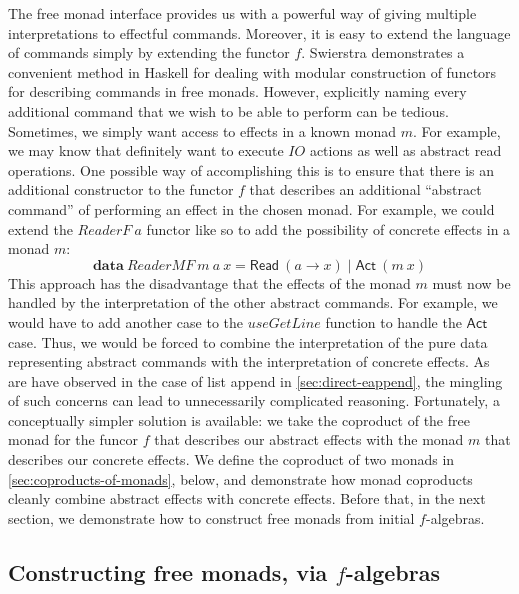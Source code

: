 \documentclass{jfp1}
\newcommand{\kw}[1]{\textbf{#1}}
\begin{document}
The free monad interface provides us with a powerful way of giving
multiple interpretations to effectful commands. Moreover, it is easy
to extend the language of commands simply by extending the functor
$f$. Swierstra \cite{swierstra08data} demonstrates a convenient method
in Haskell for dealing with modular construction of functors for
describing commands in free monads. However, explicitly naming every
additional command that we wish to be able to perform can be
tedious. Sometimes, we simply want access to effects in a known monad
$m$. For example, we may know that definitely want to execute
$\mathit{IO}$ actions as well as abstract read operations. One
possible way of accomplishing this is to ensure that there is an
additional constructor to the functor $f$ that describes an additional
``abstract command'' of performing an effect in the chosen monad. For
example, we could extend the $\mathit{ReaderF}~a$ functor like so to
add the possibility of concrete effects in a monad $m$:
\begin{displaymath}
  \kw{data}~\mathit{ReaderMF}~m~a~x = \mathsf{Read}~(a \to x) \mathrel| \mathsf{Act}~(m~x)
\end{displaymath}
This approach has the disadvantage that the effects of the monad $m$
must now be handled by the interpretation of the other abstract
commands. For example, we would have to add another case to the
$\mathit{useGetLine}$ function to handle the $\mathsf{Act}$
case. Thus, we would be forced to combine the interpretation of the
pure data representing abstract commands with the interpretation of
concrete effects. As are have observed in the case of list append in
\autoref{sec:direct-eappend}, the mingling of such concerns can lead
to unnecessarily complicated reasoning. Fortunately, a conceptually
simpler solution is available: we take the coproduct of the free monad
for the funcor $f$ that describes our abstract effects with the monad
$m$ that describes our concrete effects. We define the coproduct of
two monads in \autoref{sec:coproducts-of-monads}, below, and
demonstrate how monad coproducts cleanly combine abstract effects with
concrete effects. Before that, in the next section, we demonstrate how
to construct free monads from initial $f$-algebras.

\subsection{Constructing free monads, via $f$-algebras}
\label{sec:construct-free-monads}
\end{document}
